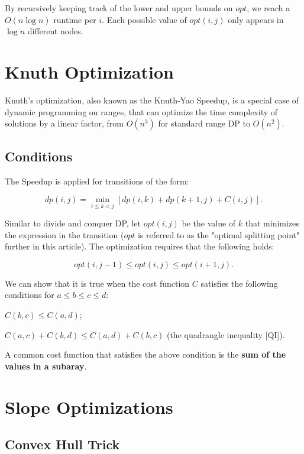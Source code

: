         By recursively keeping track of the lower and upper bounds on 
        $opt$, we reach a $O(n \log n)$ runtime per $i$. Each possible value of $opt(i, j)$ only appears in $\log n$ different nodes.


\section{Knuth Optimization}

    Knuth's optimization, also known as the Knuth-Yao Speedup, is a special case of dynamic programming on ranges, 
    that can optimize the time complexity of solutions by a linear factor, from $O(n^3)$ for standard range DP to $O(n^2)$.

    \subsection{Conditions}

        The Speedup is applied for transitions of the form:

        $$dp(i, j) = \min_{i \leq k < j} [ dp(i, k) + dp(k+1, j) + C(i, j) ].$$

        Similar to divide and conquer DP, let $opt(i, j)$ be the value of $k$ that minimizes the expression in the transition 
        ($opt$ is referred to as the "optimal splitting point" further in this article). The optimization requires that the following holds:

        $$opt(i, j-1) \leq opt(i, j) \leq opt(i+1, j).$$

        We can show that it is true when the cost function 
        $C$ satisfies the following conditions for $a \leq b \leq c \leq d$:

        $C(b, c) \leq C(a, d)$;

        $C(a, c) + C(b, d) \leq C(a, d) + C(b, c)$ (the quadrangle inequality [QI]).

        A common cost function that satisfies the above condition is the \textbf{sum of the values in a subaray}.


\section{Slope Optimizations}

    \subsection{Convex Hull Trick}

